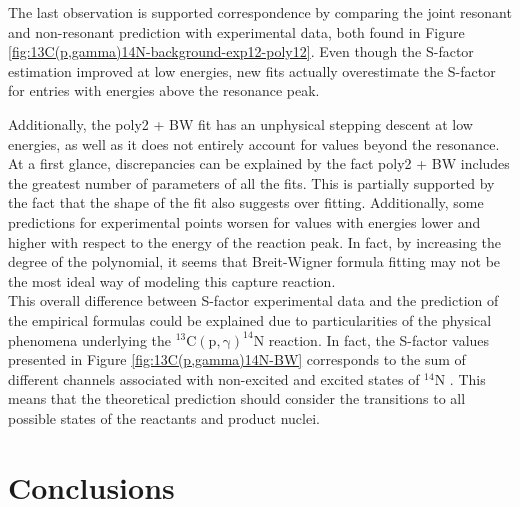 \documentclass[openany]{book}
\begin{document}
The last observation is supported correspondence by comparing the joint resonant and non-resonant prediction with experimental data, both found in Figure \ref{fig:13C(p,gamma)14N-background-exp12-poly12}. Even though the S-factor estimation improved at low energies, new fits actually overestimate the  S-factor for entries with energies above the resonance peak. 


Additionally, the poly2 + BW fit has an unphysical stepping descent at low energies, as well as it does not entirely account for values beyond the resonance. At a first glance, discrepancies can be explained by the fact poly2 + BW includes the greatest number of parameters of all the fits. This is partially supported by the fact that the shape of the fit also suggests over fitting. Additionally, some predictions for experimental points worsen for values with energies lower and higher with respect to the energy of the reaction peak.  In fact, by increasing the degree of the polynomial, it seems that Breit-Wigner formula fitting may not be the most ideal way of modeling this capture reaction. \\ 

This overall difference between S-factor experimental data and the prediction of the empirical formulas could be explained due to particularities of the physical phenomena underlying the $\mathrm{{}^{13}C(p, \gamma)^{14}N}$ reaction. In fact, the S-factor values presented in Figure \ref{fig:13C(p,gamma)14N-BW} corresponds to the sum of different channels associated with non-excited and excited states of  $\mathrm{{}^{14}N}$ \cite{xu_takahashi_goriely_arnould_ohta_utsunomiya_2013}. This means that the theoretical prediction should consider the transitions to all possible states of the reactants and product nuclei. 



\chapter{Conclusions} \label{ch:conclusions}
\end{document}
